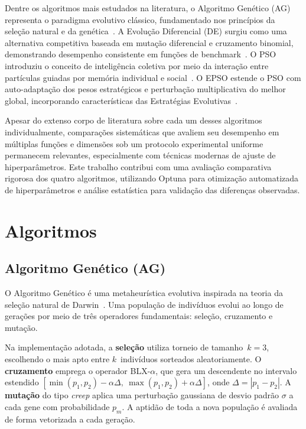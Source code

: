 \documentclass[runningheads]{llncs}
\begin{document}
Dentre os algoritmos mais estudados na literatura, o Algoritmo Genético
(AG) representa o paradigma evolutivo clássico, fundamentado nos
princípios da seleção natural e da genética~\cite{goldberg1989}. A
Evolução Diferencial (DE) surgiu como uma alternativa competitiva
baseada em mutação diferencial e cruzamento binomial, demonstrando
desempenho consistente em funções de benchmark~\cite{storn1997}. O PSO
introduziu o conceito de inteligência coletiva por meio da interação
entre partículas guiadas por memória individual e social~\cite{kennedy1995}.
O EPSO estende o PSO com auto-adaptação dos pesos estratégicos e
perturbação multiplicativa do melhor global, incorporando características
das Estratégias Evolutivas~\cite{miranda2002}.

Apesar do extenso corpo de literatura sobre cada um desses algoritmos
individualmente, comparações sistemáticas que avaliem seu desempenho em
múltiplas funções e dimensões sob um protocolo experimental uniforme
permanecem relevantes, especialmente com técnicas modernas de ajuste de
hiperparâmetros. Este trabalho contribui com uma avaliação comparativa
rigorosa dos quatro algoritmos, utilizando Optuna para otimização
automatizada de hiperparâmetros e análise estatística para validação
das diferenças observadas.


\section{Algoritmos}
\label{sec:algoritmos}

\subsection{Algoritmo Genético (AG)}

O Algoritmo Genético é uma metaheurística evolutiva inspirada na teoria
da seleção natural de Darwin~\cite{goldberg1989}. Uma população de
indivíduos evolui ao longo de gerações por meio de três operadores
fundamentais: seleção, cruzamento e mutação.

Na implementação adotada, a \textbf{seleção} utiliza torneio de
tamanho~$k=3$, escolhendo o mais apto entre $k$~indivíduos sorteados
aleatoriamente. O \textbf{cruzamento} emprega o operador BLX-$\alpha$,
que gera um descendente no intervalo estendido $[\min(p_1, p_2) -
\alpha\Delta,\ \max(p_1, p_2) + \alpha\Delta]$, onde $\Delta =
|p_1 - p_2|$. A \textbf{mutação} do tipo \emph{creep} aplica uma
perturbação gaussiana de desvio padrão $\sigma$ a cada gene com
probabilidade $p_m$. A aptidão de toda a nova população é avaliada
de forma vetorizada a cada geração.
\end{document}
